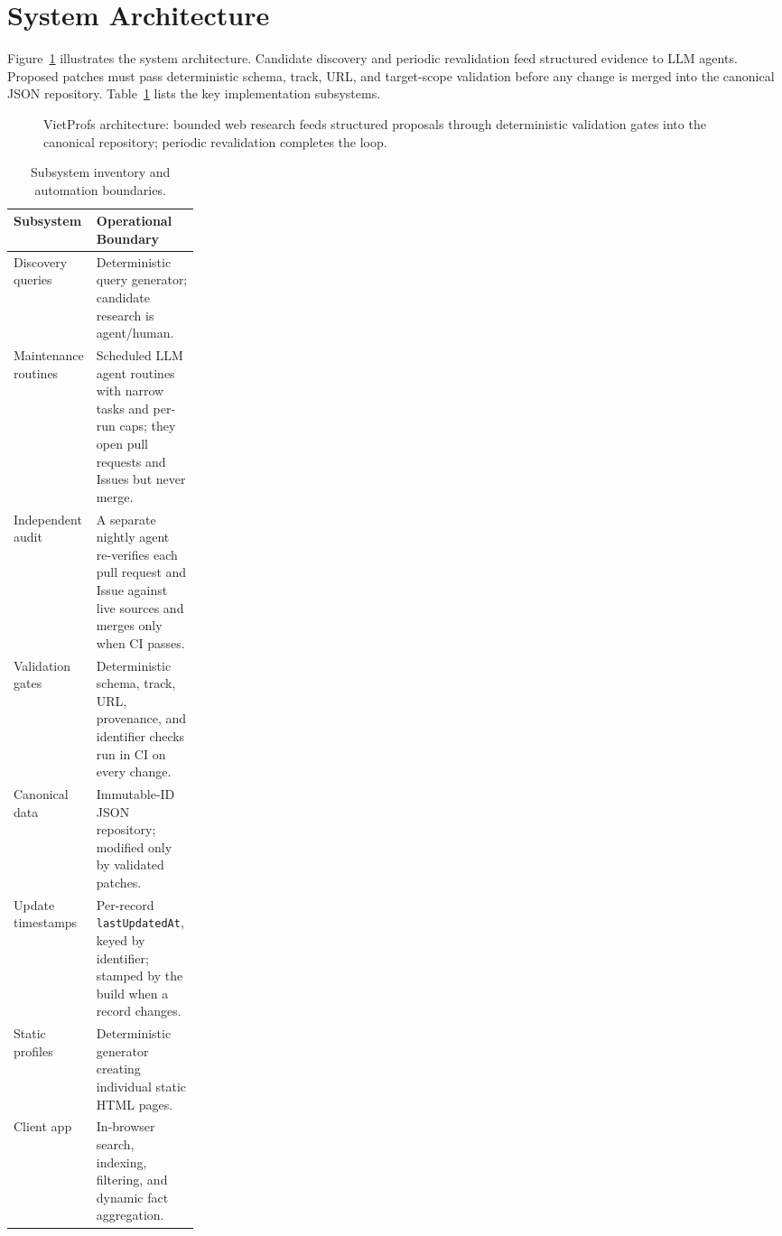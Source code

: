 \documentclass[11pt]{article}
\newcommand{\code}[1]{\texttt{\small #1}}
\begin{document}
\section{System Architecture}
\label{sec:architecture}
Figure~\ref{fig:arch} illustrates the system architecture. Candidate discovery and periodic revalidation feed structured evidence to LLM agents. Proposed patches must pass deterministic schema, track, URL, and target-scope validation before any change is merged into the canonical JSON repository. Table~\ref{tab:pipeline} lists the key implementation subsystems.

\begin{figure}[t]
\centering

\caption{VietProfs architecture: bounded web research feeds structured proposals through deterministic validation gates into the canonical repository; periodic revalidation completes the loop.}
\label{fig:arch}
\end{figure}

\begin{table}[t]
\centering
\caption{Subsystem inventory and automation boundaries.}
\label{tab:pipeline}
\small
\begin{tabularx}{\linewidth}{@{}>{\raggedright\arraybackslash}p{0.24\linewidth}X@{}}
\toprule
Subsystem & Operational Boundary \\
\midrule
Discovery queries & Deterministic query generator; candidate research is agent/human. \\
Maintenance routines & Scheduled LLM agent routines with narrow tasks and per-run caps; they open pull requests and Issues but never merge. \\
Independent audit & A separate nightly agent re-verifies each pull request and Issue against live sources and merges only when CI passes. \\
Validation gates & Deterministic schema, track, URL, provenance, and identifier checks run in CI on every change. \\
Canonical data & Immutable-ID JSON repository; modified only by validated patches. \\
Update timestamps & Per-record \code{lastUpdatedAt}, keyed by identifier; stamped by the build when a record changes. \\
Static profiles & Deterministic generator creating individual static HTML pages. \\
Client app & In-browser search, indexing, filtering, and dynamic fact aggregation. \\
\bottomrule
\end{tabularx}
\end{table}
\end{document}
